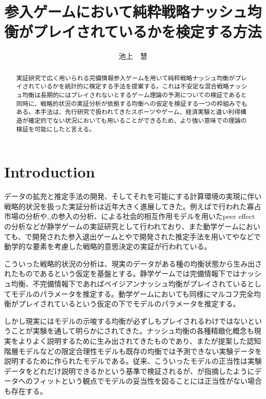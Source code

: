 \documentclass{jsarticle}
\begin{document}
\title{参入ゲームにおいて純粋戦略ナッシュ均衡がプレイされているかを検定する方法}
\author{池上　慧}
\maketitle

\begin{abstract}
	実証研究で広く用いられる完備情報参入ゲームを用いて純粋戦略ナッシュ均衡がプレイされているかを統計的に検定する手法を提案する。これは不安定な混合戦略ナッシュ均衡は長期的にはプレイされないとするゲーム理論の予測についての検証であると同時に、戦略的状況の実証分析が依拠する均衡への仮定を検証する一つの枠組みでもある。本手法は、先行研究で扱われてきたスポーツやゲーム、経済実験と違い利得構造が確定的でない状況においても用いることができるため、より強い意味での理論の検証を可能にしたと言える。
\end{abstract}

\section{Introduction}
データの拡充と推定手法の開発、そしてそれを可能にする計算環境の実現に伴い戦略的状況を扱った実証分析は近年大きく進展してきた。例えば\cite{Publishing2010}で行われた寡占市場の分析や\cite{Bresnahan1991},\cite{Tamer2003a},\cite{Seim2006}の参入の分析、\cite{Brock2001a}による社会的相互作用モデルを用いたpeer effectの分析などが静学ゲームの実証研究として行われており、また動学ゲームにおいても、\cite{Pakes1994}で開発された参入退出ゲームと\cite{Aguirregabiria2007}や\cite{Bajari2007}で開発された推定手法を用いて\cite{Exler2013}や\cite{Ryan2012}などで動学的な要素を考慮した戦略的意思決定の実証が行われている。

こういった戦略的状況の分析は、現実のデータがある種の均衡状態から生み出されたものであるという仮定を基盤とする。静学ゲームでは完備情報下ではナッシュ均衡、不完備情報下であればベイジアンナッシュ均衡がプレイされているとしてモデルのパラメータを推定する。動学ゲームにおいても同様にマルコフ完全均衡がプレイされているという仮定の下でモデルのパラメータを推定する。

しかし現実にはモデルの示唆する均衡が必ずしもプレイされるわけではないということが実験を通して明らかにされてきた。ナッシュ均衡の各種精緻化概念も現実をよりよく説明するために生み出されてきたものであり、また\cite{Economics2014}が提案した認知階層モデルなどの限定合理性モデルも既存の均衡では予測できない実験データを説明するために作られたモデルである。従来、こういったモデルの正当性は実験データをどれだけ説明できるかという基準で検証されるが、\cite{Haile2016}が指摘したようにデータへのフィットという観点でモデルの妥当性を図ることには正当性がない場合も存在する。
\end{document}
